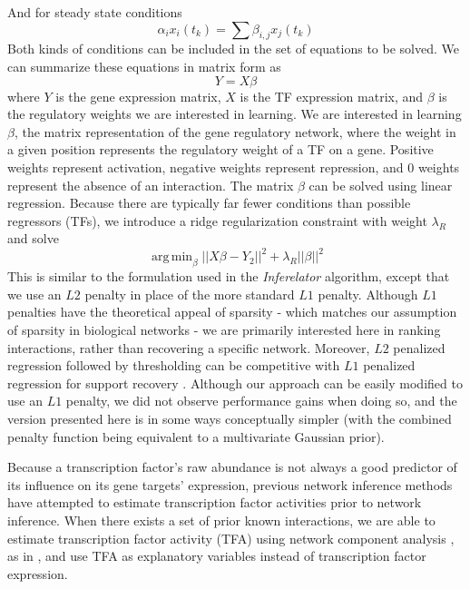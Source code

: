 \documentclass[11pt]{article}
\DeclareMathOperator*{\argmin}{arg\,min}
\begin{document}
And for steady state conditions
\begin{equation}
\alpha_{i}x_{i}(t_k) = \sum \beta_{i,j}x_{j}(t_k)
\end{equation}
Both kinds of conditions can be included in the set of equations to be solved. We can summarize these equations in matrix form as
\begin{equation}
Y = X \beta 
\end{equation}
where $Y$ is the gene expression matrix, $X$ is the TF expression matrix, and $\beta$ is the regulatory weights we are interested in learning.
We are interested in learning $\beta$, the matrix representation of the gene regulatory network, where the weight in a given position represents the regulatory weight of a TF on a gene. 
Positive weights represent activation, negative weights represent repression, and 0 weights represent the absence of an interaction. The matrix $\beta$ can be solved using linear regression. 
Because there are typically far fewer conditions than possible regressors (TFs), we introduce a ridge regularization constraint with weight $\lambda_R$ and solve
\begin{equation}
\argmin_\beta\vert \vert X\beta - Y_2 \vert \vert ^2 + \lambda_R \vert \vert \beta \vert \vert ^2
\end{equation}
This is similar to the formulation used in the \textit{Inferelator} algorithm, except that we use an $L2$ penalty in place of the more standard $L1$ penalty. Although $L1$ penalties have the theoretical appeal of sparsity - which matches our assumption of sparsity in biological networks - we are primarily interested here in ranking interactions, rather than recovering a specific network. Moreover, $L2$ penalized regression followed by thresholding can be competitive with $L1$ penalized regression for support recovery \cite{}. Although our approach can be easily modified to use an $L1$ penalty, we did not observe performance gains when doing so, and the version presented here is in some ways conceptually simpler (with the combined penalty function being equivalent to a multivariate Gaussian prior). 

Because a transcription factor's raw abundance is not always a good predictor of its influence on its gene targets' expression, previous network inference methods have attempted to estimate transcription factor activities prior to network inference. When there exists a set of prior known interactions, we are able to estimate transcription factor activity (TFA) using network component analysis \cite{liao2003network}, as in \cite{arrieta-ortiz_experimentally_2015, fu_reconstructing_2011}, and use TFA as explanatory variables instead of transcription factor expression. 
\end{document}
